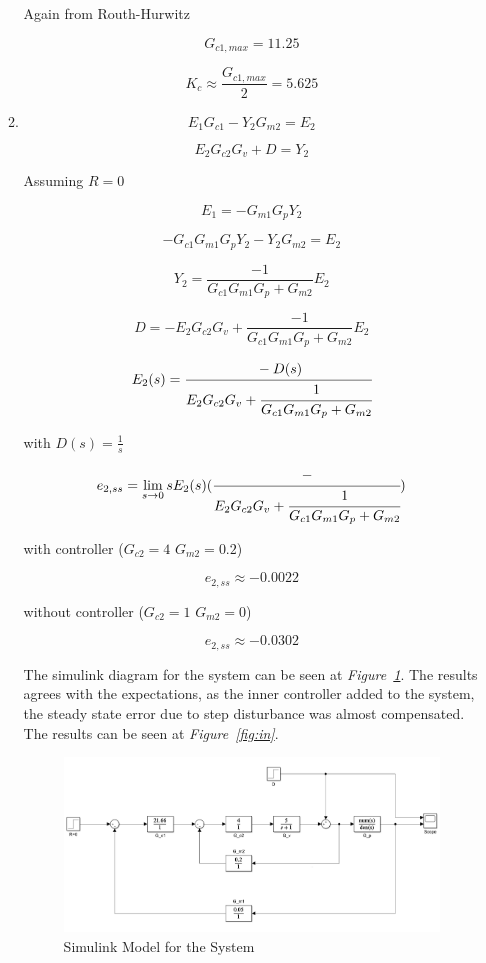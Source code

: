\documentclass[a4paper,12pt]{article}
\begin{document}
\begin{enumerate}
\begin{enumerate}
				Again from Routh-Hurwitz
				
				$$ G_{c1,max}= 11.25  $$
				
				$$\boxed{ K_c \approx \frac{G_{c1,max}}{2}=5.625 }$$
				
				\item 
				
					$$ E_1G_{c1}-Y_2G_{m2}=E_2$$
					
					$$ E_2G_{c2}G_v+D=Y_2$$
					
					Assuming $R=0$
					
					$$ E_1=-G_{m1}G_pY_2$$	
					
					$$ -G_{c1}G_{m1}G_pY_2-Y_2G_{m2}=E_2$$
					
					$$ Y_2=\frac{-1}{G_{c1}G_{m1}G_p+G_{m2}}E_2$$
					
					$$ D=-E_2G_{c2}G_v+\frac{-1}{G_{c1}G_{m1}G_p+G_{m2}}E_2$$
					
					$$ E_2(s)=\cfrac{-D(s)}{E_2G_{c2}G_v+\cfrac{1}{G_{c1}G_{m1}G_p+G_{m2}}}$$
				
					with $D(s)=\frac{1}{s}$
					
					$$ e_{2,ss}=\lim_{s \to 0} sE_2(s)(\cfrac{-}{E_2G_{c2}G_v+\cfrac{1}{G_{c1}G_{m1}G_p+G_{m2}}})$$
					
					with controller ($G_{c2}=4$ $G_{m2}=0.2$)
					
					$$ e_{2,ss} \approx -0.0022 $$

					without controller ($G_{c2}=1$ $G_{m2}=0$)
					
					$$ e_{2,ss} \approx -0.0302 $$
					
				The simulink diagram for the system can be seen at \textit{Figure~\ref{fig:simu5}}. The results agrees with the expectations, as the inner controller added to the system, the steady state error due to step disturbance was almost compensated. The results can be seen at \textit{Figure~\ref{fig:in}}.
			
				\begin{figure}[H]
					\center
					\setlength{\unitlength}{\textwidth} 
					\includegraphics[width=0.6\unitlength]{images/q5}
					\caption{\label{fig:simu5} Simulink Model for the System   }
				\end{figure}
				

\end{enumerate}
\end{enumerate}
\end{document}
